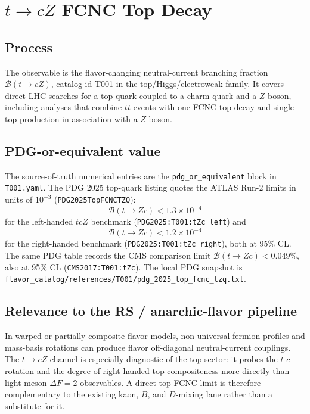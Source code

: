 
\section{\texorpdfstring{\(t\to c Z\)}{t -> c Z} FCNC Top Decay}

\subsection*{Process}
The observable is the flavor-changing neutral-current branching fraction
\(\mathcal{B}(t\to cZ)\), catalog id T001 in the top/Higgs/electroweak
family.  It covers direct LHC searches for a top quark coupled to a charm
quark and a \(Z\) boson, including analyses that combine \(t\bar t\) events
with one FCNC top decay and single-top production in association with a
\(Z\) boson.

\subsection*{PDG-or-equivalent value}
The source-of-truth numerical entries are the \texttt{pdg\_or\_equivalent}
block in \texttt{T001.yaml}.  The PDG 2025 top-quark listing quotes the ATLAS
Run-2 limits in units of \(10^{-3}\) (\texttt{PDG2025TopFCNCTZQ}):
\[
  \mathcal{B}(t\to Zc) < 1.3\times 10^{-4}
\]
for the left-handed \(tcZ\) benchmark
(\texttt{PDG2025:T001:tZc\_left}) and
\[
  \mathcal{B}(t\to Zc) < 1.2\times 10^{-4}
\]
for the right-handed benchmark (\texttt{PDG2025:T001:tZc\_right}), both at
95\% CL.  The same PDG table records the CMS comparison limit
\(\mathcal{B}(t\to Zc)<0.049\%\), also at 95\% CL
(\texttt{CMS2017:T001:tZc}).  The local PDG snapshot is
\texttt{flavor\_catalog/references/T001/pdg\_2025\_top\_fcnc\_tzq.txt}.

\subsection*{Relevance to the RS / anarchic-flavor pipeline}
In warped or partially composite flavor models, non-universal fermion profiles
and mass-basis rotations can produce flavor off-diagonal neutral-current
couplings.  The \(t\to cZ\) channel is especially diagnostic of the top sector:
it probes the \(t\)-\(c\) rotation and the degree of right-handed top
compositeness more directly than light-meson \(\Delta F=2\) observables.  A
direct top FCNC limit is therefore complementary to the existing kaon, \(B\),
and \(D\)-mixing lane rather than a substitute for it.

